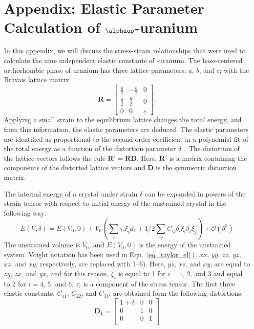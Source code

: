 \newpage
{}\label{appen_elalpha}
\section*{Appendix: Elastic Parameter Calculation of \boldmath $\alphaup$-uranium}
In this appendix, we will discuss the stress-strain relationships that were used to calculate the nine independent elastic constants of \textalpha-uranium. The base-centered orthorhombic phase of uranium has three lattice parameters: $a$, $b$, and $c$; with the Bravais lattice matrix
\begin{equation}\label{eq_lattic_alphaU}
\mathbf{R} = \begin{bmatrix}
			\frac{a}{2} & -\frac{b}{2} & 0 \\
			\frac{a}{2} & \frac{b}{2} & 0 \\
			0			&    0        & c 
			\end{bmatrix}.
\end{equation}
Applying a small strain to the equilibrium lattice changes the total energy, and from this information, the elastic parameters are deduced. The elastic parameters are identified as proportional to the second order coefficient in a polynomial fit of the total energy as a function of the distortion parameter $\delta$~\cite{wallace1998thermodynamics}. The distortion of the lattice vectors follows the rule $\mathbf{R'}=\mathbf{RD}$. Here, $\mathbf{R'}$ is a matrix containing the components of the distorted lattice vectors and $\mathbf{D}$ is the symmetric distortion matrix.



The internal energy of a crystal under strain $\delta$ can be expanded in powers of the strain tensor with respect to initial energy of the unstrained crystal in the following way:
	\begin{equation}
	\label{eq_taylor_el}
	E(V,\delta) = E(V_0,0) + V_0 \left ( \sum_i \tau_i \xi_i d_1 + 1/2 \sum_{ij} C_{ij} \delta_i \xi_i \delta_j \xi_j \right ) + \mathcal{O}(\delta^3) 
	\end{equation}
The unstrained volume is $V_0$, and $E(V_0,0)$ is the energy of the unstrained system. Voight notation has been used in Eqn.~\eqref{eq_taylor_el} (\ie, $xx$, $yy$, $zz$, $yz$, $xz$, and $xy$, respectively, are replaced with 1--6). Here, $yz$, $xz$, and $xy$, are equal to $zy$, $zx$, and $yx$, and for this reason, $\xi_i$ is equal to 1 for $i=1$, $2$, and $3$ and equal to $2$ for $i=4$, $5$, and $6$. $\tau_i$ is a component of the stress tensor. The first three elastic constants; $C_{11}$, $C_{22}$, and $C_{33}$; are obtained form the following distortions:
\begin{equation}
\label{eq_D1}
	\mathbf{D_1} =  \begin{bmatrix}
						1+\delta & 0 & 0 \\
						0 & 1 & 0 \\
						0 & 0 & 1 \\
						\end{bmatrix}
\end{equation}


